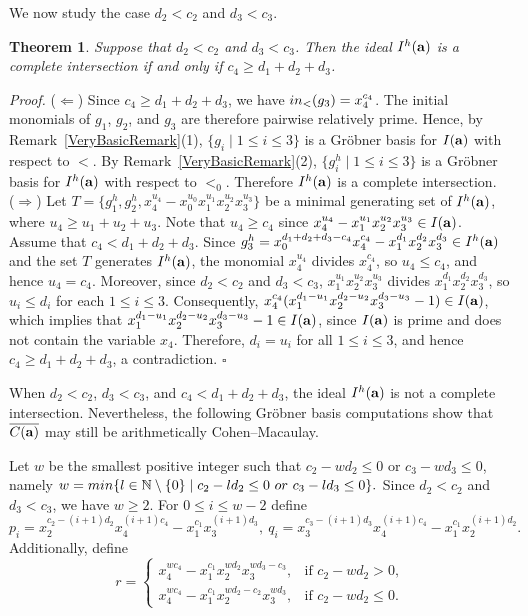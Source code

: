 \documentclass[10pt,a4paper]{amsart}
\newtheorem{thm1}{Theorem}[section]
\begin{document}
We now study the case $d_2<c_2$ and $d_3<c_3$.

\begin{thm1} \label{Basic4} Suppose that $d_2<c_2$ and $d_{3}<c_3$. Then the ideal $I^{h}({\bf a})$ is a complete intersection if and only if $c_{4} \geq d_{1}+d_{2}+d_{3}$.
\end{thm1}

{\em \noindent Proof.} ($\Leftarrow$) Since $c_{4} \geq d_1+d_2+d_{3}$, we have ${\rm in}_{<}(g_3)=x_{4}^{c_4}$. The initial monomials of $g_1$, $g_2$, and $g_3$ are therefore pairwise
relatively prime. Hence, by Remark~\ref{VeryBasicRemark}(1),
$\{g_i \mid 1 \leq i \leq 3\}$ is a Gr\"obner basis for
$I({\bf a})$ with respect to $<$.
By Remark~\ref{VeryBasicRemark}(2),
$\{g_i^{h} \mid 1 \leq i \leq 3\}$ is a Gr\"obner basis for
$I^{h}({\bf a})$ with respect to $<_0$.
Therefore $I^{h}({\bf a})$ is a complete intersection.\\ 
($\Rightarrow$) Let $T=\{g_{1}^{h}, g_{2}^{h}, x_{4}^{u_4}-x_{0}^{u_0}x_{1}^{u_1}x_{2}^{u_2}x_{3}^{u_3}\}$ be a minimal generating set of $I^{h}({\bf a})$, where $u_{4} \geq u_{1}+u_{2}+u_{3}$. Note that $u_{4} \geq c_{4}$ since $x_{4}^{u_4}-x_{1}^{u_1}x_{2}^{u_2}x_{3}^{u_3} \in I({\bf a})$. Assume that $c_{4}<d_1+d_{2}+d_{3}$. Since $g_{3}^{h}=x_{0}^{d_1+d_{2}+d_{3}-c_{4}}x_{4}^{c_4}-x_{1}^{d_1}x_{2}^{d_{2}}x_{3}^{d_{3}} \in I^{h}({\bf a})$ and the set $T$ generates $I^{h}({\bf a})$, the monomial $x_{4}^{u_4}$ divides $x_{4}^{c_4}$, so $u_4 \leq c_4$, and hence $u_4=c_4$. Moreover, since $d_2<c_2$ and $d_3<c_3$, $x_{1}^{u_1}x_{2}^{u_2}x_{3}^{u_3}$ divides $x_{1}^{d_1}x_{2}^{d_{2}}x_{3}^{d_{3}}$, so $u_i \leq d_i$ for each $1 \leq i \leq 3$. Consequently, $x_{4}^{c_4} (x_1^{d_1-u_1}x_2^{d_2-u_2}x_3^{d_3-u_3}-1) \in I({\bf a})$, which implies that $x_1^{d_1-u_1}x_2^{d_2-u_2}x_3^{d_3-u_3}-1 \in I({\bf a})$, since $I({\bf a})$ is prime and does not contain the variable $x_4$. Therefore, $d_i=u_i$ for all $1 \leq i \leq 3$, and hence $c_4 \geq d_1+d_2+d_3$, a contradiction. \hfill $\square$ \par\vspace{0.5\baselineskip}

When $d_{2}<c_2$, $d_3<c_3$, and $c_4<d_1+d_2+d_3$, the ideal $I^{h}({\bf a})$ is not a complete intersection. Nevertheless, the following Gr\"obner basis computations show that $\overline{C({\bf a})}$ may still be arithmetically Cohen--Macaulay.

Let $w$ be the smallest positive integer such that $c_2-wd_{2} \leq 0$ or $c_3-wd_{3} \leq 0$, namely $w={\rm min} \{l \in \mathbb{N} \setminus \{0\} \mid c_{2}-ld_{2} \leq 0 \ \textrm{or} \ c_{3}-ld_{3} \leq 0\}.$ Since $d_2<c_2$ and $d_3<c_3$, we have $w \geq 2$. For $0 \leq i \leq w-2$ define $$p_{i}=x_{2}^{c_{2}-(i+1)d_{2}}x_{4}^{(i+1)c_{4}}-x_{1}^{c_1}x_{3}^{(i+1)d_{3}}, \ q_{i}=x_{3}^{c_{3}-(i+1)d_3}x_{4}^{(i+1)c_{4}}-x_{1}^{c_1}x_{2}^{(i+1)d_2}.$$ Additionally, define \[
r =
\begin{cases}
x_4^{wc_4}-x_1^{c_1}x_2^{wd_2}x_3^{wd_3-c_3},
& \text{if } c_2-wd_2>0,\\[4pt]
x_4^{wc_4}-x_1^{c_1}x_2^{wd_2-c_2}x_3^{wd_3},
& \text{if } c_2-wd_2 \leq 0.
\end{cases}
\]
\end{document}
